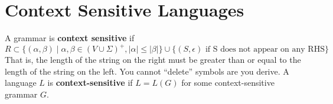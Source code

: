\section{Context Sensitive Languages}

  \begin{definition}
    \label{def:context-sensitive}
    A grammar is \textbf{context sensitive} if 
    \begin{equation}
      R \subset \{(\alpha, \beta) \mid \alpha, \beta \in (V \cup \Sigma)^+, |\alpha| \leq |\beta|\} \cup \{(S, \epsilon) \text{ if S does not appear on any RHS} \}
    \end{equation}
    That is, the length of the string on the right must be greater than or equal to the length of the string on the left. You cannot ``delete'' symbols are you derive. A language $L$ is \textbf{context-sensitive} if $L = L(G)$ for some context-sensitive grammar $G$. 
  \end{definition}

